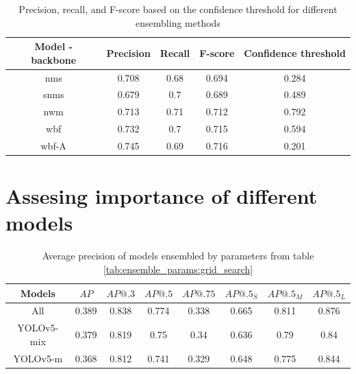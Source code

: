 \begin{table}[h]
    \begin{tabular}{|c|c|c|c|c|}
        \hline
        Model - backbone & Precision & Recall & F-score & Confidence threshold \\ \hline
        nms              & 0.708     & 0.68   & 0.694   & 0.284                \\ \hline
        snms             & 0.679     & 0.7    & 0.689   & 0.489                \\ \hline
        nwm              & 0.713     & 0.71   & 0.712   & 0.792                \\ \hline
        wbf              & 0.732     & 0.7    & 0.715   & 0.594                \\ \hline
        wbf-A            & 0.745     & 0.69   & 0.716   & 0.201                \\ \hline
    \end{tabular}
    \caption{Precision, recall, and F-score based on the confidence threshold for different ensembling methods}
    \label{tab:ensembling_prf:grid_search}
\end{table}

\section{Assesing importance of different models}

\begin{table}[h]
    \centering
    \begin{tabular}{|c|c|c|c|c|c|c|c|}
        \hline
        Models     & $AP$  & $AP@.3$ & $AP@.5$ & $AP@.75$ & $AP@.5_S$ & $AP@.5_M$ & $AP@.5_L$ \\ \hline
        All        & 0.389 & 0.838   & 0.774   & 0.338    & 0.665     & 0.811     & 0.876     \\ \hline
        YOLOv5-mix & 0.379 & 0.819   & 0.75    & 0.34     & 0.636     & 0.79      & 0.84      \\ \hline
        YOLOv5-m   & 0.368 & 0.812   & 0.741   & 0.329    & 0.648     & 0.775     & 0.844     \\ \hline
    \end{tabular}
    \caption{Average precision of models ensembled by parameters from table \ref{tab:ensemble_params:grid_search}}
    \label{tab:precision:grid_search}
\end{table}


